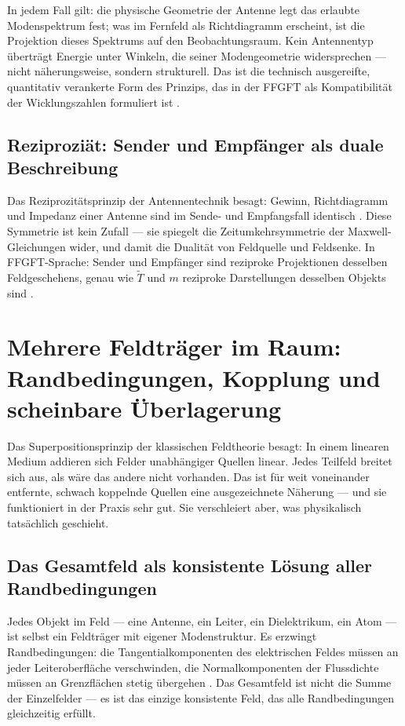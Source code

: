 In jedem Fall gilt: die physische Geometrie der Antenne legt das erlaubte
Modenspektrum fest; was im Fernfeld als Richtdiagramm erscheint, ist die
Projektion dieses Spektrums auf den Beobachtungsraum. Kein Antennentyp
überträgt Energie unter Winkeln, die seiner Modengeometrie widersprechen ---
nicht näherungsweise, sondern strukturell. Das ist die technisch ausgereifte,
quantitativ verankerte Form des Prinzips, das in der FFGFT als Kompatibilität
der Wicklungszahlen formuliert ist \SM.

\subsection*{Reziproziät: Sender und Empfänger als duale Beschreibung}

Das Reziprozitätsprinzip der Antennentechnik besagt: Gewinn, Richtdiagramm
und Impedanz einer Antenne sind im Sende- und Empfangsfall identisch \cite{Balanis2016,Griffiths1999}.
Diese Symmetrie ist kein Zufall --- sie spiegelt die Zeitumkehrsymmetrie
der Maxwell-Gleichungen wider, und damit die Dualität von Feldquelle und
Feldsenke. In FFGFT-Sprache: Sender und Empfänger sind reziproke
Projektionen desselben Feldgeschehens, genau wie $\tilde{T}$ und $m$
reziproke Darstellungen desselben Objekts sind \SM.

\section{Mehrere Feldträger im Raum: Randbedingungen, Kopplung und scheinbare Überlagerung}

Das Superpositionsprinzip der klassischen Feldtheorie besagt: In einem linearen
Medium addieren sich Felder unabhängiger Quellen linear. Jedes Teilfeld breitet
sich aus, als wäre das andere nicht vorhanden. Das ist für weit voneinander
entfernte, schwach koppelnde Quellen eine ausgezeichnete Näherung --- und sie
funktioniert in der Praxis sehr gut. Sie verschleiert aber, was physikalisch
tatsächlich geschieht.

\subsection*{Das Gesamtfeld als konsistente Lösung aller Randbedingungen}

Jedes Objekt im Feld --- eine Antenne, ein Leiter, ein Dielektrikum, ein Atom
--- ist selbst ein Feldträger mit eigener Modenstruktur. Es erzwingt
Randbedingungen: die Tangentialkomponenten des elektrischen Feldes müssen
an jeder Leiteroberfläche verschwinden, die Normalkomponenten der
Flussdichte müssen an Grenzflächen stetig übergehen \EM. Das Gesamtfeld
ist nicht die Summe der Einzelfelder --- es ist das einzige konsistente
Feld, das alle Randbedingungen gleichzeitig erfüllt.

